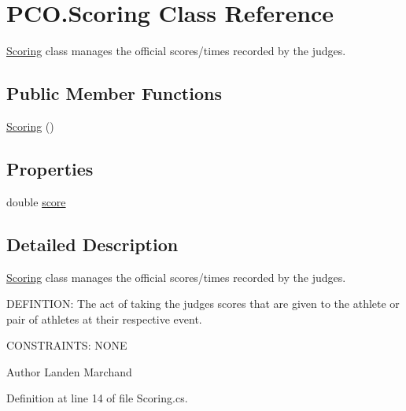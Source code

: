 \hypertarget{classPCO_1_1Scoring}{\section{P\+C\+O.\+Scoring Class Reference}
\label{classPCO_1_1Scoring}
}


\hyperlink{classPCO_1_1Scoring}{Scoring} class manages the official scores/times recorded by the judges.  


\subsection*{Public Member Functions}
\begin{DoxyCompactItemize}
\item 
\hyperlink{classPCO_1_1Scoring_a5c7b4dd99f9e1dd82da4a0e85442614f}{Scoring} ()
\end{DoxyCompactItemize}
\subsection*{Properties}
\begin{DoxyCompactItemize}
\item 
double \hyperlink{classPCO_1_1Scoring_ab7397ece9935a9607873c94753f62420}{score}
\end{DoxyCompactItemize}


\subsection{Detailed Description}
\hyperlink{classPCO_1_1Scoring}{Scoring} class manages the official scores/times recorded by the judges. 

D\+E\+F\+I\+N\+T\+I\+O\+N\+: The act of taking the judges scores that are given to the athlete or pair of athletes at their respective event.

C\+O\+N\+S\+T\+R\+A\+I\+N\+T\+S\+: N\+O\+N\+E\begin{DoxyAuthor}{Author}
Landen Marchand 
\end{DoxyAuthor}


Definition at line 14 of file Scoring.\+cs.



